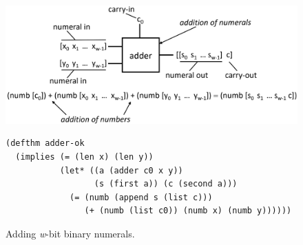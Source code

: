 \begin{figure}
\begin{center}
\includegraphics[scale=1]{images-cmyk/adder-thm}
\begin{code}
\begin{verbatim}
(defthm adder-ok
  (implies (= (len x) (len y))
           (let* ((a (adder c0 x y))
                  (s (first a)) (c (second a)))
             (= (numb (append s (list c)))
                (+ (numb (list c0)) (numb x) (numb y))))))
\end{verbatim}
\end{code}
\end{center}
\caption{Adding \emph{w}-bit binary numerals.}
\label{fig:adder-thm}
\end{figure}

